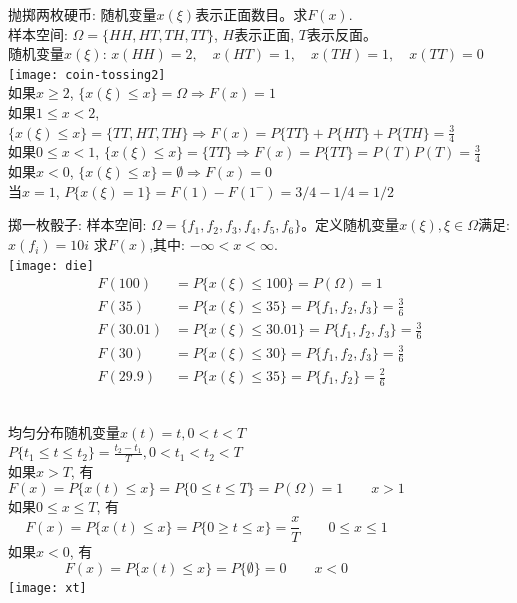 \begin{frame}[shrink]
抛掷两枚硬币: 随机变量$x(\xi)$表示正面数目。求$F(x)$.\\
样本空间: $\Omega=\{HH,HT,TH,TT\}$, $H$表示正面, $T$表示反面。\\
随机变量$x(\xi)$: $x(HH)=2,\quad x(HT)=1, \quad x(TH)=1, \quad x(TT)=0$
\texttt{[image: coin-tossing2]}\\
如果$x\ge 2$, $\{x(\xi)\le x\}=\Omega \Rightarrow F(x)=1$ \\
如果$1\le x<2$, $\{x(\xi)\le x\}=\{TT,HT,TH\} \Rightarrow F(x)=P\{TT\}+P\{HT\}+P\{TH\}=\frac{3}{4}$ \\
如果$0\le x<1$, $\{x(\xi)\le x\}=\{TT\} \Rightarrow F(x)=P\{TT\}=P(T)P(T)=\frac{3}{4}$ \\
如果$x<0$, $\{x(\xi)\le x \}=\emptyset \Rightarrow F(x)=0$ \\
当$x=1$, $P\{x(\xi)=1\}=F(1)-F(1^{-})=3/4-1/4=1/2$
\end{frame}

\begin{frame}[shrink]
掷一枚骰子: 样本空间: $\Omega=\{f_1,f_2,f_3,f_4,f_5,f_6\}$。定义随机变量$x(\xi),\xi\in \Omega$满足:$x(f_i)=10i$
求$F(x)$,其中: $-\infty<x<\infty$.\\
\texttt{[image: die]}
\begin{align*}
F(100)&=P\{x(\xi)\le 100 \}=P(\Omega)=1\\
F(35)&=P\{x(\xi)\le 35 \}=P\{f_1,f_2,f_3 \}=\frac{3}{6} \\
F(30.01)&=P\{x(\xi)\le 30.01 \}=P\{f_1,f_2,f_3 \}=\frac{3}{6} \\
F(30)&=P\{x(\xi)\le 30 \}=P\{f_1,f_2,f_3 \}=\frac{3}{6} \\
F(29.9)&=P\{x(\xi)\le 35 \}=P\{f_1,f_2 \}=\frac{2}{6} \\
\end{align*}
\end{frame}

\begin{frame}
\begin{columns}
	均匀分布随机变量$x(t)=t,0<t<T$\\
	$P\{t_1\le t\le t_2\}=\frac{t_2-t_1}{T},0<t_1<t_2<T$\\
	如果$x> T$, 有
	\[F(x)=P\{x(t)\le x \}=P\{0\le t\le T \}=P(\Omega)= 1\qquad x> 1 \] 
	如果$0\le x\le T$, 有
	\[F(x)=P\{x(t)\le x \}=P\{0\ge t\le x\}=\frac{x}{T} \qquad 0\le x\le 1 \] 
	如果$x<0$, 有
	\[F(x)=P\{x(t)\le x \}=P\{\emptyset\}=0 \qquad x<0 \] 
	\texttt{[image: xt]}
\end{columns}
\end{frame}

